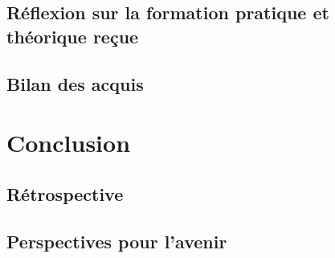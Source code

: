 \documentclass[12pt]{article} 	%
\begin{document}
\subsection{Réflexion sur la formation pratique et théorique reçue} %




\subsection{Bilan des acquis}


\newpage
\section{Conclusion}

\subsection{Rétrospective}

\subsection{Perspectives pour l'avenir}
\end{document}
